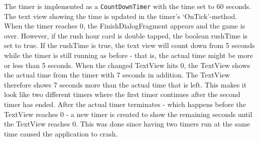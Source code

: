 \newpage
The timer is implemented as a \verb|CountDownTimer| with the time set to 60 seconds. The text view showing the time is updated in the timer’s ‘OnTick’-method.  When the timer reaches 0, the FinishDialogFragment appears and the game is over. However, if the rush hour card is double tapped, the boolean rushTime is set to true. If the rushTime is true, the text view will count down from 5 seconds while the timer is still running as before -  that is, the actual time might be more or less than 5 seconds. When the changed TextView hits 0, the TextView shows the actual time from the timer with 7 seconds in addition. The TextView therefore shows 7 seconds more than the actual time that is left. This makes it look like two different timers where the first timer continues after the second timer has ended. After the actual timer terminates - which happens before the TextView reaches 0 - a new timer is created to show the remaining seconds until the TextView reaches 0. This was done since having two timers run at the same time caused the application to crash.  


